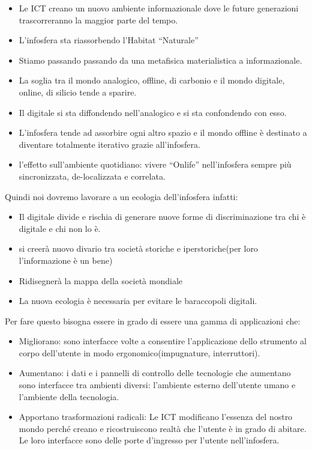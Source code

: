 \documentclass[a4page, 11pt]{article}
\begin{document}
\begin{itemize}
	 
	\item
	Le ICT creano un nuovo ambiente informazionale dove le future
	generazioni trascorreranno la maggior parte del tempo.
	\item
	L'infosfera sta riassorbendo l'Habitat ``Naturale''
	\item
	Stiamo passando passando da una metafisica materialistica a
	informazionale.
	\item
	La soglia tra il mondo analogico, offline, di carbonio e il mondo
	digitale, online, di silicio tende a sparire.
	\item
	Il digitale si sta diffondendo nell'analogico e si sta confondendo con
	esso.
	\item
	L'infosfera tende ad assorbire ogni altro spazio e il mondo offline è
	destinato a diventare totalmente iterativo grazie all'infosfera.
	\item
	l'effetto sull'ambiente quotidiano: vivere ``Onlife'' nell'infosfera
	sempre più sincronizzata, de-localizzata e correlata.
\end{itemize}

Quindi noi dovremo lavorare a un ecologia dell'infosfera infatti:

\begin{itemize}
	 
	\item
	Il digitale divide e rischia di generare nuove forme di
	discriminazione tra chi è digitale e chi non lo è.
	\item
	si creerà nuovo divario tra società storiche e iperstoriche(per loro
	l'informazione è un bene)
	\item
	Ridisegnerà la mappa della società mondiale
	\item
	La nuova ecologia è necessaria per evitare le baraccopoli digitali.
\end{itemize}

Per fare questo bisogna essere in grado di essere una gamma di
applicazioni che:

\begin{itemize}
	 
	\item
	Migliorano: sono interfacce volte a consentire l'applicazione dello
	strumento al corpo dell'utente in modo ergonomico(impugnature,
	interruttori).
	\item
	Aumentano: i dati e i pannelli di controllo delle tecnologie che
	aumentano sono interfacce tra ambienti diversi: l'ambiente esterno
	dell'utente umano e l'ambiente della tecnologia.
	\item
	Apportano trasformazioni radicali: Le ICT modificano l'essenza del
	nostro mondo perché creano e ricostruiscono realtà che l'utente è in
	grado di abitare. Le loro interfacce sono delle porte d'ingresso per
	l'utente nell'infosfera.
\end{itemize}
\end{document}
